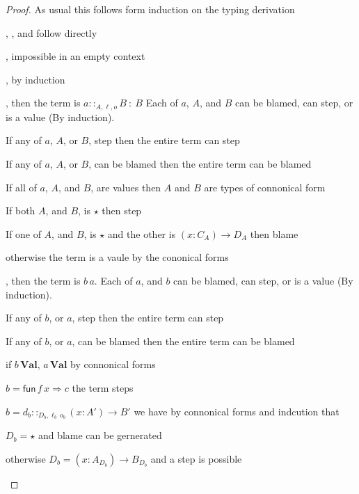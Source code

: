\begin{proof}
As usual this follows form induction on the typing derivation

\begin{casenv}
  \item {}, , and  follow directly
  \item {}, impossible in an empty context
  \item {}, by induction
  \item {}, then the term is $a::_{A,\ell ,o}B\::\:B$
  Each of $a$, $A$, and $B$ can be blamed, can step, or is a value (By induction).
  \begin{casenv}
    \item If any of $a$, $A$, or $B$, step then the entire term can step
    \item If any of $a$, $A$, or $B$, can be blamed then the entire term can be blamed
    \item If all of $a$, $A$, and $B$, are values then $A$ and $B$ are types of connonical form
    \begin{casenv}
      \item If both $A$, and $B$, is $\star$ then step
      \item If one of $A$, and $B$, is $\star$ and the other is $\left(x:C_{A}\right)\rightarrow D_{A}$ then blame
      
      \item otherwise the term is a vaule by the cononical forms
    \end{casenv}
  \end{casenv}
  \item {}, then the term is $b\,a$.
   Each of $a$, and $b$ can be blamed, can step, or is a value (By induction).
   \begin{casenv}
     \item If any of $b$, or $a$, step then the entire term can step
     \item If any of $b$, or $a$, can be blamed then the entire term can be blamed
     \item if $b\,\textbf{Val}$, $a\,\textbf{Val}$ by connonical forms
     \begin{casenv}
       \item $b=\mathsf{fun}\,f\,x\Rightarrow c$ the term steps
       \item $b=d_{b}::_{D_{b},\ell _{b}\,o_{b}}\left(x:A'\right)\rightarrow B'$ we have by connonical forms and indcution that 
       \begin{casenv}
         \item $D_{b}=\star$ and blame can be gernerated
         \item otherwise $D_{b}=\left(x:A_{D_{b}}\right)\rightarrow B_{D_{b}}$ and a step is possible
       \end{casenv}
     \end{casenv}
   \end{casenv}
\end{casenv}
\end{proof}


